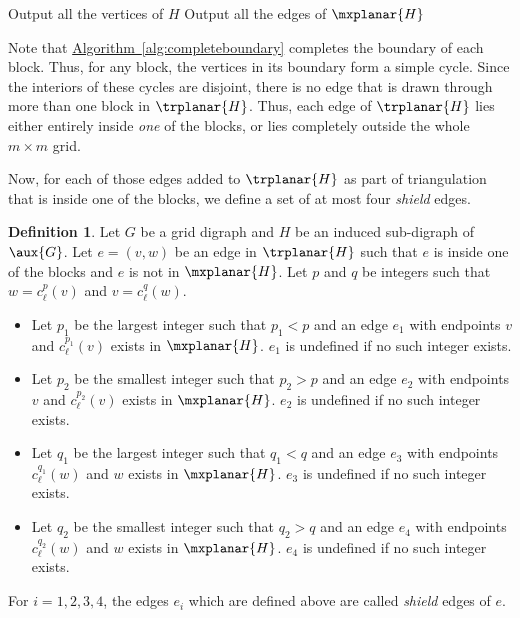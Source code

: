 \documentclass[11pt]{article}
\numberwithin{equation}{section}
\theoremstyle{definition}
\newtheorem{definition}[theorem]{Definition}
\theoremstyle{plain}
\newcommand{\expref}[2]{\hyperref[#2]{#1~\ref{#2}}}
\begin{document}
\begin{algorithm}
\LinesNumbered
\caption{Completing the boundary of $\mxplanar{H}$}
\label{alg:completeboundary}
%

Output all the vertices of $H$\;
Output all the edges of $\mxplanar{H}$\;
\end{algorithm}

Note that \expref{Algorithm}{alg:completeboundary} completes the boundary of each block. Thus, for any block, the vertices in its boundary form a simple cycle. Since the interiors of these cycles are disjoint, there is no edge that is drawn through more than one block in $\trplanar{H}$. Thus, each edge of $\trplanar{H}$ %
lies  %
either entirely inside \emph{one} of the blocks, or
%
lies  %
completely outside the whole $m \times m$ grid.

Now, for each of those edges added to $\trplanar{H}$ as part of triangulation that is inside one of the blocks, we define a set of at most four \emph{shield} edges.

\begin{definition}Let $G$ be a grid %
digraph %
 and $H$ be %
an induced  %
sub-digraph %
 of $\aux{G}$. Let $e = (v, w)$ be an edge in $\trplanar{H}$ such that $e$ is inside one of the blocks and $e$ is not %
 in $\mxplanar{H}$. Let $p$ and $q$ be integers such that $w = c_{\ell}^{p}(v)$ and $v = c_{\ell}^q(w)$.

\begin{itemize}
\item Let $p_1$ be the largest integer such that $p_1 < p$ and an edge $e_1$ with endpoints $v$ and $c_{\ell}^{p_1}(v)$ exists in $\mxplanar{H}$. $e_1$ is undefined if no such integer exists.
\item Let $p_2$ be the smallest integer such that $p_2 > p$ and an edge $e_2$ with endpoints $v$ and $c_{\ell}^{p_2}(v)$ exists in $\mxplanar{H}$. $e_2$ is undefined if no such integer exists.
\item Let $q_1$ be the largest integer such that $q_1 < q$ and an edge $e_3$ with endpoints $c_{\ell}^{q_1}(w)$ and $w$ exists in $\mxplanar{H}$. $e_3$ is undefined if no such integer exists.
\item Let $q_2$ be the smallest integer such that $q_2 > q$ and an edge $e_4$ with endpoints $c_{\ell}^{q_2}(w)$ and $w$ exists in $\mxplanar{H}$. $e_4$ is undefined if no such integer exists.
\end{itemize}
For $i = 1,2,3,4$, the edges $e_i$ which are defined above are called \emph{shield} edges of $e$.
\end{definition}
\end{document}
